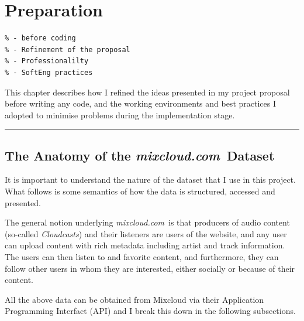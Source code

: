 \documentclass[a4paper,12pt,twoside,notitlepage]{report}
\def\mixurl{\emph{mixcloud.com}}
\newcommand{\rulewidth}{300pt}
\newcommand{\halfrule}{
  \begin{center}
    {\rule{\rulewidth}{0.5pt}}
  \end{center}}
\begin{document}
\chapter{Preparation}

\begin{verbatim}
% - before coding
% - Refinement of the proposal
% - Professionalilty
% - SoftEng practices 
\end{verbatim}

This chapter describes how I refined the ideas presented in my project proposal
before writing any code, and the working environments and best practices I
adopted to minimise problems during the implementation stage.

\halfrule

\section{The Anatomy of the \mixurl\ Dataset}

It is important to understand the nature of the dataset that I use in this
project. What follows is some semantics of how the data is structured, accessed
and presented. 

The general notion underlying \mixurl\ is that producers of audio
content (so-called \emph{Cloudcasts}) and their listeners are users of the
website, and any user can upload content with rich metadata including artist and
track information. The users can then listen to and favorite content, and
furthermore, they can follow other users in whom they are interested, either
socially or because of their content.

All the above data can be obtained from Mixcloud via their Application
Programming Interfact (API) and I break this down in the following subsections.
\end{document}
